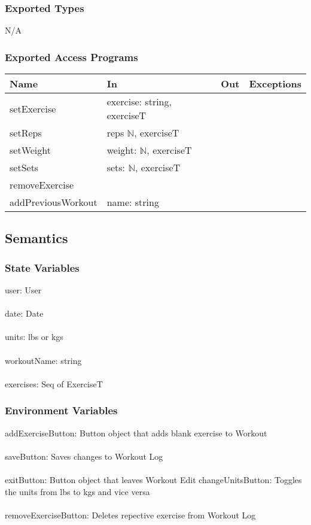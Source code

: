 \documentclass[12pt, titlepage]{article}
\begin{document}
\subsubsection{Exported Types}
N/A

\subsubsection{Exported Access Programs}

\begin{tabular}{| l | l | l | l |}
	\hline
	{\textbf{Name}} & {\textbf{In}} & {\textbf{Out}} & {\textbf{Exceptions}}\\
	\hline
	{setExercise} & exercise: string, exerciseT & & \\
	\hline
    {setReps} & reps $\mathbb{N}$, exerciseT & & \\
    \hline
    {setWeight} & weight: $\mathbb{N}$, exerciseT & & \\
    \hline
    {setSets} & sets: $\mathbb{N}$, exerciseT & &\\
    \hline
    {removeExercise} & & &\\
    \hline
    {addPreviousWorkout} & name: string & &\\
    \hline
\end{tabular}

\subsection{Semantics}

\subsubsection{State Variables}

user: User\\\\
date: Date\\\\
units: lbs or kgs\\\\
workoutName: string\\\\
exercises: Seq of ExerciseT

\subsubsection{Environment Variables}

addExerciseButton: Button object that adds blank exercise to Workout\\\\
saveButton: Saves changes to Workout Log\\\\
exitButton: Button object that leaves Workout Edit
changeUnitsButton: Toggles the units from lbs to kgs and vice versa\\\\
removeExerciseButton: Deletes repective exercise from Workout Log
\end{document}
